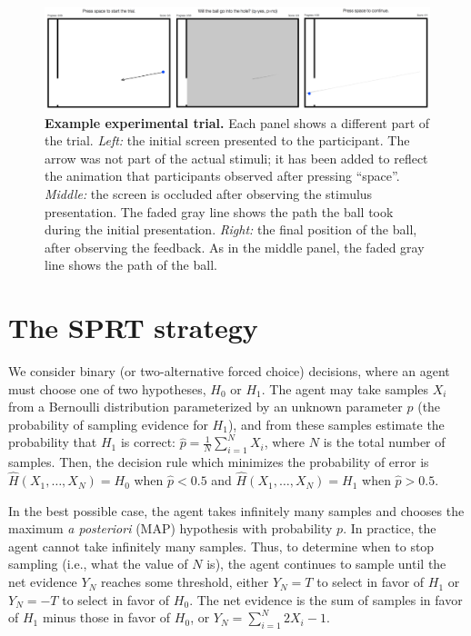 \documentclass[10pt,letterpaper]{article}
\begin{document}
\begin{figure}[t!]
    \begin{center}
        \includegraphics[width=\textwidth]{figures/experiment.png}
        \caption{\textbf{Example experimental trial.} 
        Each panel shows a different part of the trial. 
        \emph{Left:} the initial screen presented to the participant.
        The arrow was not part of the actual stimuli; it has been added to reflect the animation that participants observed after pressing ``space''. 
        \emph{Middle:}  the screen is occluded after observing the stimulus presentation. 
        The faded gray line shows the path the ball took during the initial presentation. 
        \emph{Right:} the final position of the ball, after observing the feedback. 
        As in the middle panel, the faded gray line shows the path of the ball.}
        \label{fig:experiment}
    \end{center}
\end{figure}

\section{The SPRT strategy}

We consider binary (or two-alternative forced choice) decisions, where an agent must choose one of two hypotheses, $H_0$ or $H_1$. 
The agent may take samples $X_i$ from a Bernoulli distribution parameterized by an unknown parameter $p$ (the probability of sampling evidence for $H_1$), and from these samples estimate the probability that $H_1$ is correct: $\hat{p}=\frac{1}{N}\sum_{i=1}^N X_i$, where $N$ is the total number of samples. 
Then, the decision rule which minimizes the probability of error is $\hat{H}(X_1,\ldots{},X_N)=H_0$ when $\hat{p}<0.5$ and $\hat{H}(X_1,\ldots{},X_N)=H_1$ when $\hat{p}>0.5$.

In the best possible case, the agent takes infinitely many samples and chooses the maximum \emph{a posteriori} (MAP) hypothesis with probability $p$. 
In practice, the agent cannot take infinitely many samples. 
Thus, to determine when to stop sampling (i.e., what the value of $N$ is), the agent continues to sample until the net evidence $Y_N$ reaches some threshold, either $Y_N=T$ to select in favor of $H_1$ or $Y_N=-T$ to select in favor of $H_0$. 
The net evidence is the sum of samples in favor of $H_1$ minus those in favor of $H_0$, or $Y_N=\sum_{i=1}^N 2X_i-1$.
\end{document}
